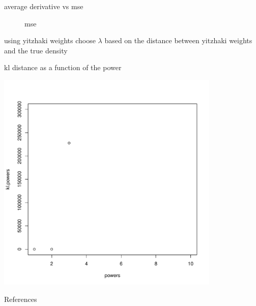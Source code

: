 \documentclass[10pt,xcolor=table]{beamer}
\begin{document}
\begin{frame}{average derivative vs mse}
\begin{figure}[ht]
\begin{minipage}[t]{0.45\linewidth}
                        \caption{mse}
            \label{fig:b}
        \end{minipage}
    \end{figure}
\end{frame}


\begin{frame}{using yitzhaki weights}
	choose $\lambda$ based on the distance between yitzhaki weights and the true density
\end{frame}


\begin{frame}{kl distance as a function of the power}
\begin{center}
\includegraphics[width=0.8\textwidth,keepaspectratio]{kl.pdf}
\end{center}
\end{frame}

\begin{frame}{References} 
\label{lastpage} \small %

%
\end{frame}
\end{document}
